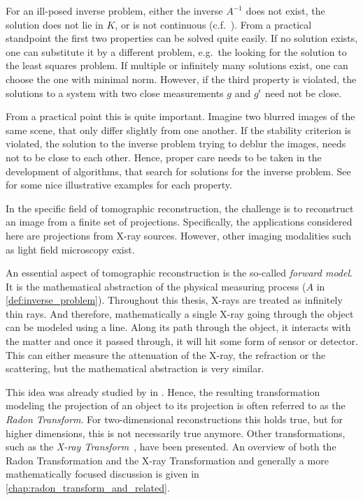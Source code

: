 For an ill-posed inverse problem, either the inverse \(A^{-1}\) does not exist, the solution does
not lie in \(K\), or is not continuous (c.f.~\cite[Chapter~4]{natterer_mathematics_1986}). From a
practical standpoint the first two properties can be solved quite easily. If no solution exists, one
can substitute it by a different problem, e.g.\ the looking for the solution to the least squares
problem. If multiple or infinitely many solutions exist, one can choose the one with minimal norm.
However, if the third property is violated, the solutions to a system with two close measurements
\(g\) and \(g^\epsilon\) need not be close.

From a practical point this is quite important. Imagine two blurred images of the same scene, that
only differ slightly from one another. If the stability criterion is violated, the solution to the
inverse problem trying to deblur the images, needs not to be close to each other. Hence, proper care
needs to be taken in the development of algorithms, that search for solutions for the inverse
problem. See \textcite{hansen_discrete_2010} for some nice illustrative examples for each property.

In the specific field of tomographic reconstruction, the challenge is to reconstruct an image from a
finite set of projections. Specifically, the applications considered here are projections from X-ray
sources. However, other imaging modalities such as light field microscopy exist.

An essential aspect of tomographic reconstruction is the so-called \textit{forward model}. It is the
mathematical abstraction of the physical measuring process (\(A\) in \autoref{def:inverse_problem}).
Throughout this thesis, X-rays are treated as infinitely thin rays. And therefore, mathematically a
single X-ray going through the object can be modeled using a line. Along its path through the
object, it interacts with the matter and once it passed through, it will hit some form of sensor or
detector. This can either measure the attenuation of the X-ray, the refraction or the scattering,
but the mathematical abstraction is very similar.

This idea was already studied by \textcite{radon_uber_1917} in \citeyear{radon_uber_1917}. Hence,
the resulting transformation modeling the projection of an object to its projection is often
referred to as the \textit{Radon Transform}. For two-dimensional reconstructions this holds true,
but for higher dimensions, this is not necessarily true anymore. Other transformations, such as the
\textit{X-ray Transform}~\cite{solmon_x-ray_1976}, have been presented. An overview of both the
Radon Transformation and the X-ray Transformation and generally a more mathematically focused
discussion is given in \autoref{chap:radon_transform_and_related}.

